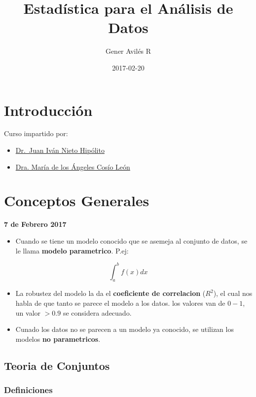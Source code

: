 \documentclass[]{book}
\title{Estadística para el Análisis de Datos}
\author{Gener Avilés R}
\date{2017-02-20}
\providecommand{\tightlist}{%
  \setlength{\itemsep}{0pt}\setlength{\parskip}{0pt}}
\begin{document}
\maketitle

{
\setcounter{tocdepth}{1}
\tableofcontents
}
\chapter{Introducción}\label{introduccion}

Curso impartido por:

\begin{itemize}
\tightlist
\item
  \href{https://www.researchgate.net/profile/Juan_Nieto6}{Dr.~Juan Iván
  Nieto Hipólito}
\item
  \href{https://www.researchgate.net/profile/Maria_Cosio_Leon}{Dra.
  María de los Ángeles Cosío León}
\end{itemize}

\chapter{Conceptos Generales}\label{conceptos-generales}

\textbf{7 de Febrero 2017}

\begin{itemize}
\tightlist
\item
  Cuando se tiene un modelo conocido que se asemeja al conjunto de
  datos, se le llama \textbf{modelo parametrico}. P.ej:
\end{itemize}

\[\int_{a}^{b} f(x)dx\]

\begin{itemize}
\tightlist
\item
  La robustez del modelo la da el \textbf{coeficiente de correlacion}
  (\(R^2\)), el cual nos habla de que tanto se parece el modelo a los
  datos. los valores van de \(0-1\), un valor \(>0.9\) se considera
  adecuado.
\item
  Cunado los datos no se parecen a un modelo ya conocido, se utilizan
  los modelos \textbf{no parametricos}.
\end{itemize}

\section{Teoria de Conjuntos}\label{teoria-de-conjuntos}

\subsection{Definiciones}\label{definiciones}
\end{document}
